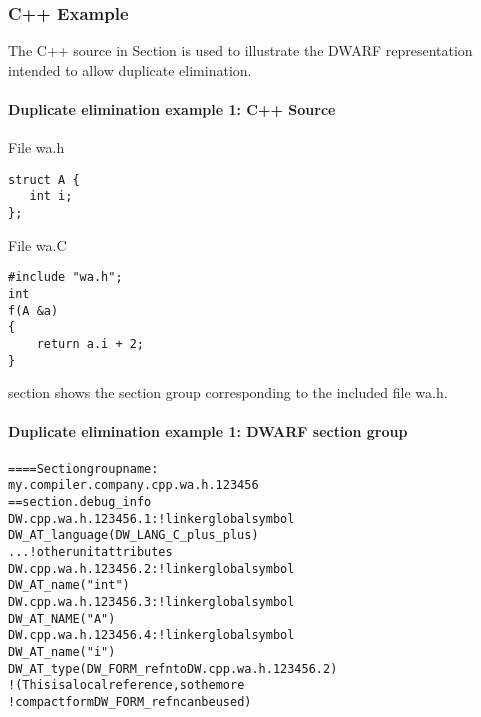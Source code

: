 \subsubsection{C++ Example}

The C++ source in 
Section 
is used to illustrate the DWARF
representation intended to allow duplicate elimination.

\paragraph{Duplicate elimination example 1: C++ Source} 
\label{app:duplicateeliminationexample1csource}

File wa.h

\begin{lstlisting}
struct A {
   int i;
};
\end{lstlisting}

File wa.C

\begin{lstlisting}
#include "wa.h";
int
f(A &a)
{
    return a.i + 2;
}
\end{lstlisting}


section 
shows the section group corresponding to the included file 
wa.h.


\paragraph{Duplicate elimination example 1: DWARF section group} 

\label{app:duplicateeliminationexample1dwarfsectiongroup}

\begin{alltt}
==== Section group name:
    my.compiler.company.cpp.wa.h.123456
== section .debug\_info
DW.cpp.wa.h.123456.1: ! linker global symbol
        DW\-\_AT\-\_language(DW\-\_LANG\-\_C\-\_plus\-\_plus)
        ...  ! other unit attributes
DW.cpp.wa.h.123456.2: ! linker global symbol
        DW\-\_AT\-\_name("int")
DW.cpp.wa.h.123456.3: ! linker global symbol
        DW\-\_AT\-\_NAME("A")
DW.cpp.wa.h.123456.4: ! linker global symbol
        DW\-\_AT\-\_name("i")
        DW\-\_AT\-\_type(DW\-\_FORM\-\_refn to DW.cpp.wa.h.123456.2)
            ! (This is a local reference, so the more
            ! compact form DW\-\_FORM\-\_refn can be used)
\end{alltt}


